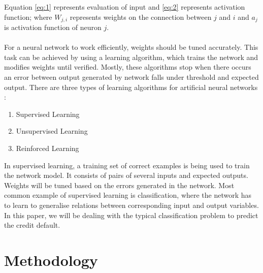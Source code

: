 \documentclass{article}[]
\begin{document}
Equation \ref{eq:1} represents evaluation of input and \ref{eq:2} represents activation function; where $W_{j,i}$ represents weights on the connection between $j$ and $i$ and $a_{j}$ is activation function of neuron $j$.\\\\
For a neural network to work efficiently, weights should be tuned accurately. This task can be achieved by using a learning algorithm, which trains the network and modifies weights until verified. Mostly, these algorithms stop when there occurs an error between output generated by network falls under threshold and expected output. There are three types of learning algorithms for artificial neural networks \cite{angelini2008neural}:
\begin{enumerate}
\item Supervised Learning
\item Unsupervised Learning
\item Reinforced Learning
\end{enumerate}

In supervised learning, a training set of correct examples is being used to train the network model. It consists of pairs of several inputs and expected outputs. Weights will be tuned based on the errors generated in the network. Most common example of supervised learning is classification, where the network has to learn to generalise relations between corresponding input and output variables. In this paper, we will be dealing with the typical classification problem to predict the credit default. 

\section{Methodology}
\end{document}
